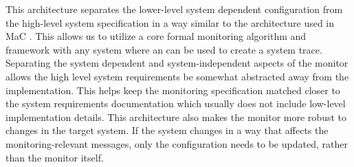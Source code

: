 This architecture separates the lower-level system dependent configuration from the high-level system specification in a way similar to the architecture used in MaC \cite{Kim2004}.
This allows us to utilize a core formal monitoring algorithm and framework with any system where an \sfmap can be used to create a system trace.
Separating the system dependent and system-independent aspects of the monitor allows the high level system requirements be somewhat abstracted away from the implementation. 
This helps keep the monitoring specification matched closer to the system requirements documentation which usually does not include low-level implementation details. 
This architecture also makes the monitor more robust to changes in the target system.
If the system changes in a way that affects the monitoring-relevant messages, only the \sfmap configuration needs to be updated, rather than the monitor itself.

